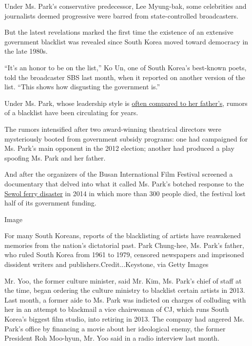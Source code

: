 Under Ms. Park's conservative predecessor, Lee Myung-bak, some
celebrities and journalists deemed progressive were barred from
state-controlled broadcasters.

But the latest revelations marked the first time the existence of an
extensive government blacklist was revealed since South Korea moved
toward democracy in the late 1980s.

``It's an honor to be on the list,'' Ko Un, one of South Korea's
best-known poets, told the broadcaster SBS last month, when it reported
on another version of the list. ``This shows how disgusting the
government is.''

Under Ms. Park, whose leadership style is
\href{http://www.nytimes3xbfgragh.onion/2016/11/12/world/asia/south-korea-park-geun-hye.html}{often
compared to her father's}, rumors of a blacklist have been circulating
for years.

The rumors intensified after two award-winning theatrical directors were
mysteriously booted from government subsidy programs: one had campaigned
for Ms. Park's main opponent in the 2012 election; another had produced
a play spoofing Ms. Park and her father.

And after the organizers of the Busan International Film Festival
screened a documentary that delved into what it called Ms. Park's
botched response to the
\href{https://www.nytimes3xbfgragh.onion/2014/04/30/world/asia/south-korea-ferry-disaster.html}{Sewol
ferry disaster} in 2014 in which more than 300 people died, the festival
lost half of its government funding.

Image

For many South Koreans, reports of the blacklisting of artists have
reawakened memories from the nation's dictatorial past. Park Chung-hee,
Ms. Park's father, who ruled South Korea from 1961 to 1979, censored
newspapers and imprisoned dissident writers and
publishers.Credit...Keystone, via Getty Images

Mr. Yoo, the former culture minister, said Mr. Kim, Ms. Park's chief of
staff at the time, began ordering the culture ministry to blacklist
certain artists in 2013. Last month, a former aide to Ms. Park was
indicted on charges of colluding with her in an attempt to blackmail a
vice chairwoman of CJ, which runs South Korea's biggest film studio,
into retiring in 2013. The company had angered Ms. Park's office by
financing a movie about her ideological enemy, the former President Roh
Moo-hyun, Mr. Yoo said in a radio interview last month.

